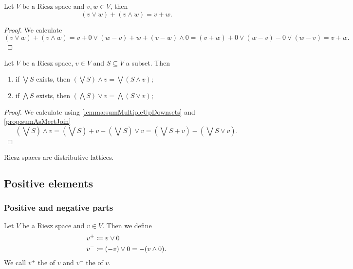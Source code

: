 \begin{proposition} \label{prop:sumAsMeetJoin}
Let $V$ be a Riesz space and $v,w\in V$, then
\[ (v \vee w) + (v \wedge w) = v+w. \]
\end{proposition}
\begin{proof}
We calculate
\[ (v \vee w) + (v \wedge w) = v + 0 \vee (w-v) + w + (v-w)\wedge 0 = (v + w) + 0 \vee (w-v) - 0 \vee (w-v) = v + w. \]
\end{proof}


\begin{proposition}
Let $V$ be a Riesz space, $v\in V$ and $S\subseteq V$ a subset. Then
\begin{enumerate}
\item if $\bigvee S$ exists, then $\left(\bigvee S\right) \wedge v = \bigvee (S\wedge v)$;
\item if $\bigwedge S$ exists, then $\left(\bigwedge S\right) \vee v = \bigwedge (S\vee v)$;
\end{enumerate}
\end{proposition}
\begin{proof}
We calculate using \ref{lemma:sumMultipleUpDownsets} and \ref{prop:sumAsMeetJoin}
\[ \left(\bigvee S\right) \wedge v = \left(\bigvee S\right) + v - \left(\bigvee S\right) \vee v = \left(\bigvee S + v\right) - \left(\bigvee S\vee v\right). \]
\end{proof}
\begin{corollary}
Riesz spaces are distributive lattices.
\end{corollary}

\subsection{Positive elements}
\subsubsection{Positive and negative parts}
\begin{definition}
Let $V$ be a Riesz space and $v\in V$. Then we define
\begin{align*}
v^+ &\coloneqq v \vee 0 \\
v^- &\coloneqq (-v) \vee 0 = - (v \wedge 0).
\end{align*}
We call $v^+$ the  of $v$ and $v^-$ the  of $v$.
\end{definition}


